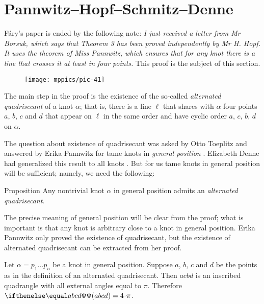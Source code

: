\section{Pannwitz--Hopf--Schmitz--Denne}\label{sec:quadrisecant}

Fáry's paper \cite{fary} is ended by the following note:
\textit{I just received a letter from Mr Borsuk, which says that Theorem 3 has been proved independently by Mr H. Hopf.
It uses the theorem of Miss Pannwitz, which ensures that for any knot there is a line that crosses it at least in four
points.}
This proof is the subject of this section.

\begin{wrapfigure}{r}{22 mm}
\vskip-4mm
\centering
\texttt{[image: mppics/pic-41]}
\vskip0mm
\end{wrapfigure}

The main step in the proof is the existence of the so-called \emph{alternated quadrisecant} of a knot $\alpha$; that is, there is a line $\ell$ that shares with $\alpha$ four points $a$, $b$, $c$ and $d$
that appear on $\ell$ in the same order and have cyclic order $a$, $c$, $b$, $d$ on $\alpha$.

The question about existence of quadrisecant was asked by Otto Toep\-litz and answered by Erika Pannwitz for tame knots in \emph{general position} \cite{pannwitz}.
Elizabeth Denne had generalized this result to all knots \cite{denne, denne-survey}.
But for us tame knots in general position will be sufficient;
namely, we need the following:

\begin{thm}{Proposition}\label{prop:quadrisecant}
Any nontrivial knot $\alpha$ in general position admits an \emph{alternated quadrisecant}.
\end{thm}

The precise meaning of general position will be clear from the proof;
what is important is that any knot is arbitrary close to a knot in general position.
Erika Pannwitz only proved the existence of quadrisecant, but the existence of alternated quadrisecant can be extracted from her proof.

Let $\alpha=p_1\dots p_n$ be a knot in general position.
Suppose $a$, $b$, $c$ and $d$ be the points as in the definition of an alternated quadrisecant.
Then $acbd$ is an inscribed quadrangle with all external angles equal to $\pi$.
Therefore $\tc{abcd}=4\cdot\pi$.

